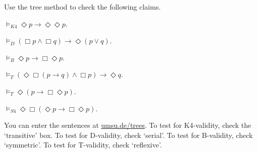 

\begin{exercise}
  Use the tree method to check the following claims.
  \begin{exlist}
    \item $\models_{K4} \Diamond p \to \Diamond\Diamond p$.
    \item $\models_{D} (\Box p \land \Box q) \to \Diamond (p \lor q)$.
    \item $\models_{B} \Diamond p \to \Box\Diamond p$.
    \item $\models_{T} (\Diamond\Box(p \to q) \land \Box p) \to \Diamond q$.
    \item $\models_{T} \Diamond (p \to \Box \Diamond p)$.
    \item $\models_{S4} \Diamond\Box(\Diamond p \to \Box\Diamond p)$. 
  \end{exlist}
\end{exercise}
\begin{solution}
  You can enter the sentences at
  \href{https://www.umsu.de/trees/}{umsu.de/trees}. To
  test for K4-validity, check the `transitive' box. To test for D-validity, check `serial'. To test for B-validity, check `symmetric'. To test for T-validity, check `reflexive'.
\end{solution}


